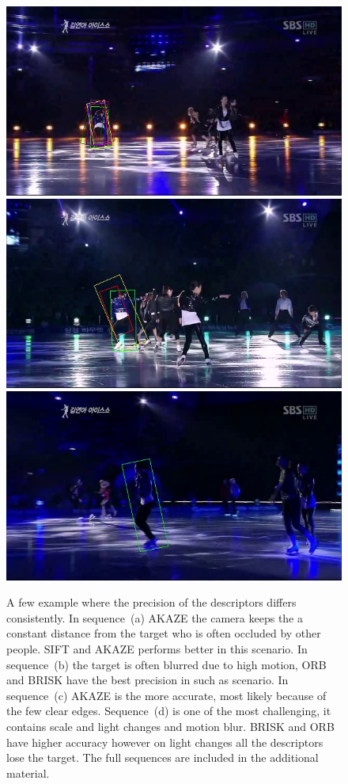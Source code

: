 \begin{figure}[!htb]
{{	           \includegraphics[width=0.24\linewidth,trim={0, 1cm 0 2cm},clip]{imgs/comparison/skating2.png}
	           \includegraphics[width=0.24\linewidth,trim={0, 1cm 0 2cm},clip]{imgs/comparison/skating3.png}
	           \includegraphics[width=0.24\linewidth,trim={0, 1cm 0 2cm},clip]{imgs/comparison/skating4.png}}
	           \label{fig:skating}}
\caption{A few example where the precision of the descriptors differs consistently. In sequence~(a) AKAZE the camera keeps the a constant distance from the target who is often occluded by other people. SIFT and AKAZE performs better in this scenario. In sequence~(b) the target is often blurred due to high motion, ORB and BRISK have the best precision in such as scenario. In sequence~(c) AKAZE is the more accurate, most likely because of the few clear edges. Sequence~(d) is one of the most challenging, it contains scale and light changes and motion blur. BRISK and ORB have higher accuracy however on light changes all the descriptors lose the target. The full sequences are included in the additional material.}
\vspace{-3mm}
\label{fig:tracking_comparison}
\end{figure}





